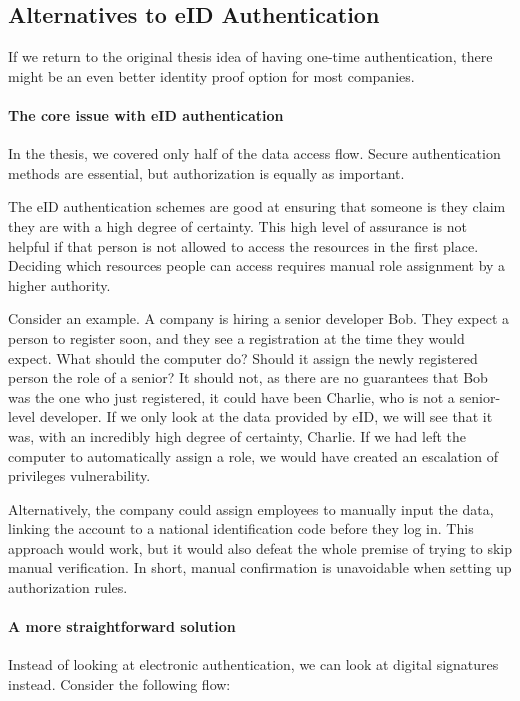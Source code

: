 \subsection{Alternatives to eID Authentication}

If we return to the original thesis idea of having one-time authentication, there might be an even better identity proof option for most companies.

\paragraph{The core issue with eID authentication}

In the thesis, we covered only half of the data access flow. Secure authentication methods are essential, but authorization is equally as important.

The eID authentication schemes are good at ensuring that someone is they claim they are with a high degree of certainty. This high level of assurance is not helpful if that person is not allowed to access the resources in the first place. Deciding which resources people can access requires manual role assignment by a higher authority.

Consider an example. A company is hiring a senior developer Bob. They expect a person to register soon, and they see a registration at the time they would expect. What should the computer do? Should it assign the newly registered person the role of a senior? It should not, as there are no guarantees that Bob was the one who just registered, it could have been Charlie, who is not a senior-level developer. If we only look at the data provided by eID, we will see that it was, with an incredibly high degree of certainty, Charlie. If we had left the computer to automatically assign a role, we would have created an escalation of privileges vulnerability.

Alternatively, the company could assign employees to manually input the data, linking the account to a national identification code before they log in. This approach would work, but it would also defeat the whole premise of trying to skip manual verification. In short, manual confirmation is unavoidable when setting up authorization rules.

\paragraph{A more straightforward solution}

Instead of looking at electronic authentication, we can look at digital signatures instead. Consider the following flow:

